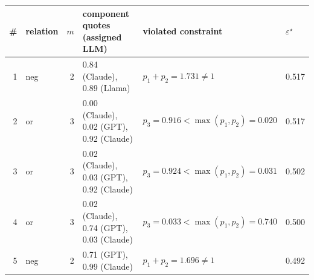 \begin{tabular}{rlrlll}
\toprule
\# & relation & $m$ & component quotes (assigned LLM) & violated constraint & $\varepsilon^\star$ \\
\midrule
1 & neg & 2 & 0.84 (Claude), 0.89 (Llama) & $p_1+p_2=1.731\ne 1$ & 0.517 \\
2 & or & 3 & 0.00 (Claude), 0.02 (GPT), 0.92 (Claude) & $p_3=0.916<\max(p_1,p_2)=0.020$ & 0.517 \\
3 & or & 3 & 0.02 (Claude), 0.03 (GPT), 0.92 (Claude) & $p_3=0.924<\max(p_1,p_2)=0.031$ & 0.502 \\
4 & or & 3 & 0.02 (Claude), 0.74 (GPT), 0.03 (Claude) & $p_3=0.033<\max(p_1,p_2)=0.740$ & 0.500 \\
5 & neg & 2 & 0.71 (GPT), 0.99 (Claude) & $p_1+p_2=1.696\ne 1$ & 0.492 \\
\bottomrule
\end{tabular}